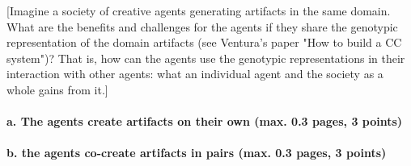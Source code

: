 \documentclass[english]{tktltiki}
\begin{document}
    [Imagine a society of creative agents generating artifacts in the same domain. 
    What are the benefits and challenges for the agents if they share the genotypic 
    representation of the domain artifacts (see Ventura's paper "How to build a CC system")? 
    That is, how can the agents use the genotypic representations in their interaction 
    with other agents: what an individual agent and the society as a whole gains from it.]
    
    \paragraph{a. The agents create artifacts on their own (max. 0.3 pages, 3 points)}
    
    \paragraph{b. the agents co-create artifacts in pairs (max. 0.3 pages, 3 points)}
    
    
\end{document}
